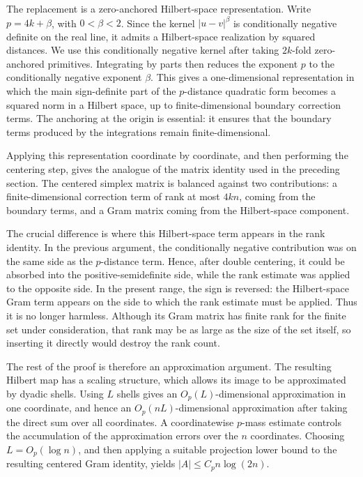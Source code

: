 \documentclass[11pt]{article}
\theoremstyle{definition}
\begin{document}
The replacement is a zero-anchored Hilbert-space representation. Write
\(p=4k+\beta\), with \(0<\beta<2\). Since the kernel
\( |u-v|^\beta
\)
is conditionally negative definite on the real line, it admits a Hilbert-space
realization by squared distances. We use this conditionally negative kernel
after taking \(2k\)-fold zero-anchored primitives. Integrating by parts then
reduces the exponent \(p\) to the conditionally negative exponent \(\beta\).
This gives a one-dimensional representation in which the main sign-definite
part of the \(p\)-distance quadratic form becomes a squared norm in a Hilbert
space, up to finite-dimensional boundary correction terms. The anchoring at the
origin is essential: it ensures that the boundary terms produced by the
integrations remain finite-dimensional.

Applying this representation coordinate by coordinate, and then performing the
centering step, gives the analogue of the matrix identity used in the preceding
section. The centered simplex matrix is balanced against two contributions: a
finite-dimensional correction term of rank at most \(4kn\), coming from the
boundary terms, and a Gram matrix coming from the Hilbert-space component.

The crucial difference is where this Hilbert-space term appears in the rank
identity. In the previous argument, the conditionally negative contribution was
on the same side as the \(p\)-distance term. Hence, after double centering, it
could be absorbed into the positive-semidefinite side, while the rank estimate
was applied to the opposite side. In the present range, the sign is reversed:
the Hilbert-space Gram term appears on the side to which the rank estimate must
be applied. Thus it is no longer harmless. Although its Gram matrix has finite
rank for the finite set under consideration, that rank may be as large as the
size of the set itself, so inserting it directly would destroy the rank count.

The rest of the proof is therefore an approximation argument. The resulting Hilbert map
has a scaling structure, which allows its image to be approximated by dyadic
shells. Using \(L\) shells gives an \(O_p(L)\)-dimensional approximation in one
coordinate, and hence an \(O_p(nL)\)-dimensional approximation after taking the
direct sum over all coordinates. A coordinatewise \(p\)-mass estimate controls
the accumulation of the approximation errors over the \(n\) coordinates.
Choosing \(L=O_{p}(\log{n})\), and then applying a suitable projection lower
bound to the resulting centered Gram identity, yields
\(
|A|\le C_p n\log(2n).
\)
\end{document}
